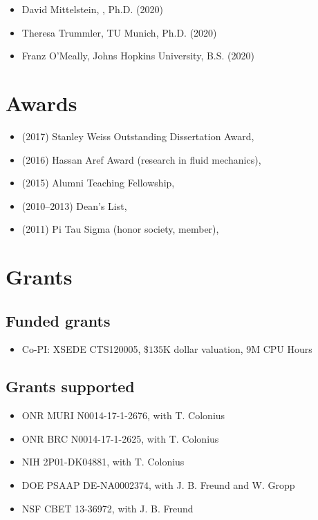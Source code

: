 \begin{itemize}
    \item David Mittelstein, \CIT, Ph.D. (2020)
    \item Theresa Trummler, TU Munich, Ph.D. (2020)
    \item Franz O'Meally, Johns Hopkins University, B.S. (2020)
\end{itemize}

\section{Awards}

\begin{itemize}
    \item (2017) Stanley Weiss Outstanding Dissertation Award, \UIUC
    \item (2016) Hassan Aref Award (research in fluid mechanics), \UIUC
    \item (2015) Alumni Teaching Fellowship, \UIUC
    \item (2010--2013) Dean's List, \UMD
    \item (2011) Pi Tau Sigma (honor society, member), \UMD
\end{itemize}

\section{Grants}

\subsection{Funded grants}

\begin{itemize}
    \item Co-PI: XSEDE CTS120005, $\$135$K dollar valuation, 9M CPU Hours
\end{itemize}

\subsection{Grants supported}

\begin{itemize}
    \item ONR MURI N0014-17-1-2676, with T. Colonius
    \item ONR BRC N0014-17-1-2625, with T. Colonius
    \item NIH 2P01-DK04881, with T. Colonius
    \item DOE PSAAP DE-NA0002374, with J. B. Freund and W. Gropp
    \item NSF CBET 13-36972, with J. B. Freund
\end{itemize}

